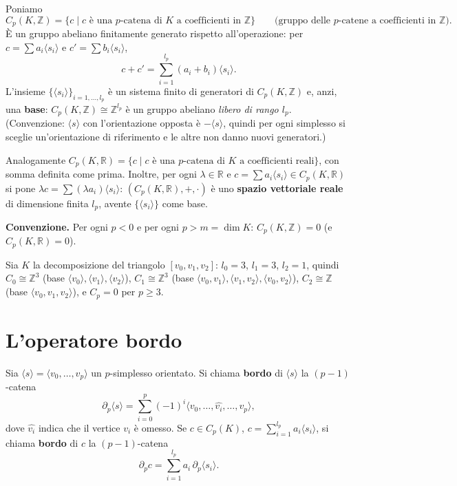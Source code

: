 Poniamo
\[
C_p(K, \mathbb{Z}) = \{ c \mid c \text{ \`e una $p$-catena di } K \text{ a coefficienti in } \mathbb{Z} \} \qquad \text{(gruppo delle $p$-catene a coefficienti in $\mathbb{Z}$)}.
\]
\`E un gruppo abeliano finitamente generato rispetto all'operazione: per $c = \sum a_i \langle s_i \rangle$ e $c' = \sum b_i \langle s_i \rangle$,
\[
c + c' = \sum_{i=1}^{l_p} (a_i + b_i) \langle s_i \rangle .
\]
L'insieme $\{ \langle s_i \rangle \}_{i = 1, \dots, l_p}$ \`e un sistema finito di generatori di $C_p(K, \mathbb{Z})$ e, anzi, una \textbf{base}: $C_p(K, \mathbb{Z}) \cong \mathbb{Z}^{l_p}$ \`e un gruppo abeliano \emph{libero di rango $l_p$}. (Convenzione: $\langle s \rangle$ con l'orientazione opposta \`e $-\langle s \rangle$, quindi per ogni simplesso si sceglie un'orientazione di riferimento e le altre non danno nuovi generatori.)

Analogamente $C_p(K, \mathbb{R}) = \{ c \mid c \text{ \`e una $p$-catena di } K \text{ a coefficienti reali} \}$, con somma definita come prima. Inoltre, per ogni $\lambda \in \mathbb{R}$ e $c = \sum a_i \langle s_i \rangle \in C_p(K, \mathbb{R})$ si pone $\lambda c = \sum (\lambda a_i) \langle s_i \rangle$: $(C_p(K, \mathbb{R}), +, \cdot)$ \`e uno \textbf{spazio vettoriale reale} di dimensione finita $l_p$, avente $\{ \langle s_i \rangle \}$ come base.

\medskip
\textbf{Convenzione.} Per ogni $p < 0$ e per ogni $p > m = \dim K$: $C_p(K, \mathbb{Z}) = 0$ (e $C_p(K, \mathbb{R}) = 0$).

\begin{ejemplo}
Sia $K$ la decomposizione del triangolo $[v_0, v_1, v_2]$: $l_0 = 3$, $l_1 = 3$, $l_2 = 1$, quindi $C_0 \cong \mathbb{Z}^3$ (base $\langle v_0 \rangle, \langle v_1 \rangle, \langle v_2 \rangle$), $C_1 \cong \mathbb{Z}^3$ (base $\langle v_0, v_1 \rangle, \langle v_1, v_2 \rangle, \langle v_0, v_2 \rangle$), $C_2 \cong \mathbb{Z}$ (base $\langle v_0, v_1, v_2 \rangle$), e $C_p = 0$ per $p \geqslant 3$.
\end{ejemplo}

\section{L'operatore bordo}

\begin{definicion}
Sia $\langle s \rangle = \langle v_0, \dots, v_p \rangle$ un $p$-simplesso orientato. Si chiama \textbf{bordo} di $\langle s \rangle$ la $(p-1)$-catena
\[
\partial_p \langle s \rangle = \sum_{i=0}^p (-1)^i \langle v_0, \dots, \widehat{v_i}, \dots, v_p \rangle ,
\]
dove $\widehat{v_i}$ indica che il vertice $v_i$ \`e omesso. Se $c \in C_p(K)$, $c = \sum_{i=1}^{l_p} a_i \langle s_i \rangle$, si chiama \textbf{bordo} di $c$ la $(p-1)$-catena
\[
\partial_p c = \sum_{i=1}^{l_p} a_i\, \partial_p \langle s_i \rangle .
\]
\end{definicion}

